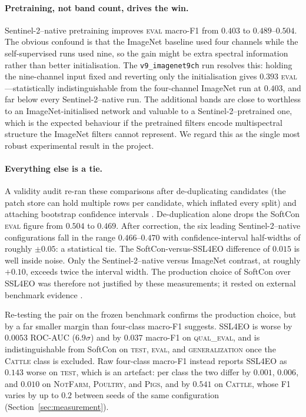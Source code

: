 \documentclass[11pt,a4paper]{article}
\newcommand{\code}[1]{\texttt{\small #1}}
\begin{document}
\paragraph{Pretraining, not band count, drives the win.}
Sentinel-2--native pretraining improves \textsc{eval} macro-F1 from $0.403$ to
$0.489$--$0.504$. The obvious confound is that the ImageNet baseline used four
channels while the self-supervised runs used nine, so the gain might be extra
spectral information rather than better initialisation. The
\code{v9\_imagenet9ch} run resolves this: holding the nine-channel input fixed
and reverting only the initialisation gives $0.393$ \textsc{eval}---statistically
indistinguishable from the four-channel ImageNet run at $0.403$, and far below
every Sentinel-2--native run. The additional bands are close to worthless to an
ImageNet-initialised network and valuable to a Sentinel-2--pretrained one, which
is the expected behaviour if the pretrained filters encode multispectral
structure the ImageNet filters cannot represent. We regard this as the single
most robust experimental result in the project.

\paragraph{Everything else is a tie.}
A validity audit re-ran these comparisons after de-duplicating candidates (the
patch store can hold multiple rows per candidate, which inflated every split)
and attaching bootstrap confidence intervals \citep{efron1987bootstrap}.
De-duplication alone drops the SoftCon \textsc{eval} figure from $0.504$ to
$0.469$. After correction, the six leading Sentinel-2--native configurations
fall in the range $0.466$--$0.470$ with confidence-interval half-widths of
roughly $\pm0.05$: a statistical tie. The SoftCon-versus-SSL4EO difference of
$0.015$ is well inside noise. Only the Sentinel-2--native versus ImageNet
contrast, at roughly $+0.10$, exceeds twice the interval width. The production
choice of SoftCon over SSL4EO was therefore not justified by these measurements;
it rested on external benchmark evidence \citep{lacoste2023geobench}.

Re-testing the pair on the frozen benchmark confirms the production choice, but
by a far smaller margin than four-class macro-F1 suggests. SSL4EO is worse by
$0.0053$ ROC-AUC ($6.9\sigma$) and by $0.037$ macro-F1 on \textsc{qual\_eval},
and is indistinguishable from SoftCon on \textsc{test}, \textsc{eval}, and
\textsc{generalization} once the \textsc{Cattle} class is excluded. Raw
four-class macro-F1 instead reports SSL4EO as $0.143$ worse on \textsc{test},
which is an artefact: per class the two differ by $0.001$, $0.006$, and $0.010$
on \textsc{NotFarm}, \textsc{Poultry}, and \textsc{Pigs}, and by $0.541$ on
\textsc{Cattle}, whose F1 varies by up to $0.2$ between seeds of the same
configuration (Section~\ref{sec:measurement}).
\end{document}
